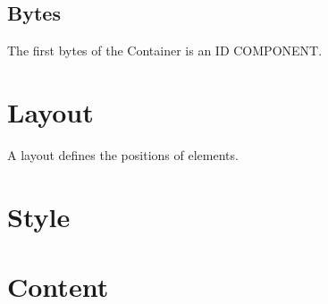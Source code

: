 \documentclass{report}
\begin{document}
\subsection{Bytes}
The first bytes of the Container is an ID COMPONENT.

\section{Layout}
A layout defines the positions of elements. 
\section{Style}
\section{Content}
\end{document}
